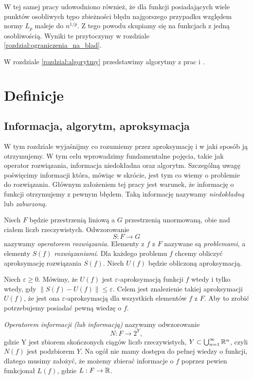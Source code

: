 \documentclass[oik, pdftex, man]{mgrwms}
\begin{document}
\begin{wstep}[Wprowadzenie]
    W tej samej pracy udowodniono również, że dla funkcji posiadających wiele punktów osobliwych tępo zbieżności błędu najgorszego przypadku względem normy $L_{p}$ maleje do $n^{1/p}$. Z tego powodu skupiamy się na funkcjach z jedną osobliwością. Wyniki te przytoczymy w rozdziale \ref{rozdzial:ograniczenia_na_blad}.

    W rozdziale \ref{rozdzial:algorytmy} przedstawimy algorytmy z prac \cite{AoP} i \cite{CoDF}.

\end{wstep}


\chapter{Definicje}


\section{Informacja, algorytm, aproksymacja}


    W tym rozdziale wyjaśnijmy co rozumiemy przez aproksymację i w jaki sposób ją otrzymujemy. W tym celu wprowadzimy fundamentalne pojęcia, takie jak operator rozwiązania, informacja niedokładna oraz algorytm. Szczególną uwagę poświęcimy informacji która, mówiąc w skrócie, jest tym co wiemy o problemie do rozwiązania. Głównym założeniem tej pracy jest warunek, że informację o funkcji otrzymujemy z pewnym błędem. Taką informację nazywamy \textit{niedokładną} lub \textit{zaburzoną}.

    Niech $F$ będzie przestrzenią liniową a $G$ przestrzenią unormowaną, obie nad ciałem liczb rzeczywistych. Odwzorowanie 
    \begin{equation*}
        S : F \rightarrow G
    \end{equation*}
    nazywamy \textit{operatorem rozwiązania}. Elementy z $f$ z $F$ nazywane są \textit{problemami}, a elementy $S(f)$ \textit{rozwiązaniami}. Dla każdego problemu $f$ chcemy obliczyć aproksymację rozwiązania $S(f)$. Niech $U(f)$ będzie obliczoną aproksymacją.

    Niech $\varepsilon \geq 0$. Mówimy, że $U(f)$ jest $\varepsilon$-aproksymacją funkcji $f$ wtedy i tylko wtedy, gdy $\| S(f) -  U(f)\| \leq \varepsilon$. Celem jest znalezienie takiej aproksymacji $U(f)$, że jest ona $\varepsilon$-aproksymacją dla wszystkich elementów $f$ z $F$. Aby to zrobić potrzebujemy posiadać pewną wiedzę o $f$.

    \textit{Operatorem informacji (lub informacją)} nazywamy odwzorowanie
    \begin{equation*}
        N : F \rightarrow 2^{Y},
    \end{equation*}
    gdzie Y jest zbiorem skończonych ciągów liczb rzeczywistych, $ Y \subset \bigcup^{\infty}_{n=1} \mathbb{R}^{n}$, czyli $N(f)$ jest podzbiorem $Y$.
    Na ogół nie mamy dostępu do pełnej wiedzy o funkcji, dlatego musimy założyć, że możemy zbierać informacje o $f$ poprzez pewien funkcjonał $L(f)$, gdzie $L : F \rightarrow \mathbb{R}$.
    
\end{document}
